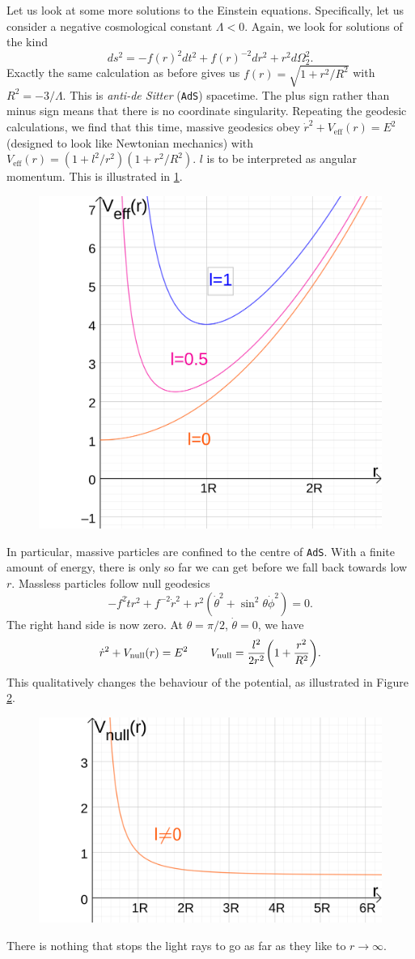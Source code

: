 Let us look at some more solutions to the Einstein equations. Specifically, let us consider a negative cosmological constant $\Lambda < 0$. Again, we look for solutions of the kind
\begin{equation}
  ds^2 = -f(r)^2 dt^2 + f(r)^{-2} dr^2 + r^2 d\Omega^2_2.
\end{equation}
Exactly the same calculation as before gives us $f(r) = \sqrt{1 + r^2/R^2}$ with $R^2 = -3/\Lambda$.
This is \emph{anti-de Sitter} (\texttt{AdS}) spacetime. The plus sign rather than minus sign means that there is no coordinate singularity.
Repeating the geodesic calculations, we find that this time, massive geodesics obey $\dot{r}^2 + V_{\text{eff}}(r) = E^2$ (designed to look like Newtonian mechanics) with $V_{\text{eff}}(r) = (1 + l^2/r^2) (1 + r^2/R^2)$.
$l$ is to be interpreted as angular momentum.
This is illustrated in \ref{fig:angmombar2}.
\begin{figure}[htpb]
  \centering
  \includegraphics[width=0.5\linewidth]{angmombar2}
  \caption{}
  \label{fig:angmombar2}
\end{figure}
In particular, massive particles are confined to the centre of \texttt{AdS}.
With a finite amount of energy, there is only so far we can get before we fall back towards low $r$.
Massless particles follow null geodesics 
\begin{equation}
  -f^2 \dot{t}r^2 + f^{-2} \dot{r}^2 + r^2(\dot{\theta}^2 + \sin^2\theta \dot{\phi}^2) = 0.
\end{equation}
The right hand side is now zero.
At $\theta = \pi/2$, $\dot{\theta} = 0$, we have 
\begin{equation}
  \label{eq:null-15}
  \dot{r}^2 + V_{\text{null}}(r) = E^2 \qquad
  V_{\text{null}} = \frac{l^2}{2r^2} \qty(1 + \frac{r^2}{R^2}).
\end{equation}
This qualitatively changes the behaviour of the potential, as illustrated in Figure \ref{fig:angmombar3}.
\begin{figure}[htpb]
  \centering
  \includegraphics[width=0.5\linewidth]{angmombar3}
  \caption{}
  \label{fig:angmombar3}
\end{figure}
There is nothing that stops the light rays to go as far as they like to $r \to \infty$.

